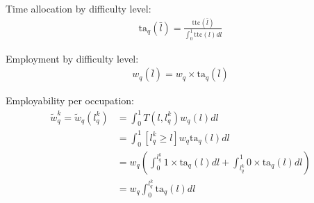 \documentclass[hidelinks, nonatbib]{elsarticle}
\begin{document}


Time allocation by difficulty level:
\begin{gather}
    \text{ta}_q(\bar{l}) = 
    \frac{
        \text{ttc}(\bar{l})
    }{
        \int_{0}^{1}{
            \text{ttc}(l)
            dl
        }
    }
\end{gather}

Employment by difficulty level:
\begin{gather}
    w_q(\bar{l}) = 
    w_q 
    \times
    \text{ta}_q(\bar{l})
\end{gather}

Employability per occupation:
\begin{align}
    \tilde{w}_{q}^{k} =
    \tilde{w}_q(l_{q}^{k}) &=
    \int_{0}^{1}
    T(l, l_{q}^{k})
    w_q(l)
    dl
    \\
    &=
    \int_{0}^{1}
    [l_{q}^{k} \geq l]
    w_q 
    \text{ta}_q(l)
    dl
    \\
    &=
    w_q
    \left(
        \int_{0}^{l_{q}^{k}}
            1 \times
            \text{ta}_q(l)
            dl
        + 
        \int_{l_{q}^{k}}^{1}
            0 \times
            \text{ta}_q(l)
            dl
    \right)
    \\
    &=
    w_q
    \int_{0}^{l_{q}^{k}}
    \text{ta}_q(l)
    dl
\end{align}
\end{document}
